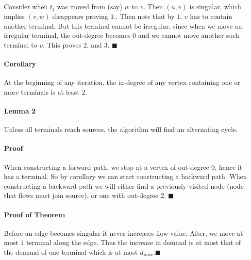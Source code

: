 \documentclass[letterpaper,12pt,oneside,onecolumn]{article}
\begin{document}
\paragraph{}
Consider when $t_j$ was moved from (say) $w$ to $v$. Then $(u,v)$ is singular, which implies $(v,w)$ disappears proving $1.$. Then note that by $1.$ $v$ has to contain another terminal. But this terminal cannot be irregular, since when we move an irregular terminal, the out-degree becomes $0$ and we cannot move another such terminal to $v$. This proves $2.$ and $3.$ $\blacksquare$
\paragraph{Corollary}
At the beginning of any iteration, the in-degree of any vertex containing one or more terminals is at least $2$.
\paragraph{Lemma 2}
Unless all terminals reach sources, the algorithm will find an alternating cycle.
\paragraph{Proof}
When constructing a forward path, we stop at a vertex of out-degree $0$, hence it has a terminal. So by corollary we can start constructing a backward path. When constructing a backward path we will either find a previously visited node (node that flows must join source), or one with out-degree $2$. $\blacksquare$
\paragraph{Proof of Theorem}
Before an edge becomes singular it never increases flow value. After, we move at most $1$ terminal along the edge. Thus the increase in demand is at most that of the demand of one terminal which is at most $d_{max}$.$\blacksquare$
\end{document}
